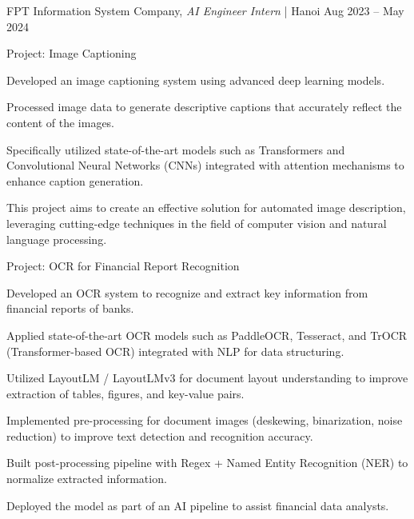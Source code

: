 \vspace{8pt}

\begin{cventries2}

  \cventrynew
  {FPT Information System Company, \textnormal{\textit{AI Engineer Intern} | Hanoi}}
  {Aug 2023 -- May 2024}
  {}

\end{cventries2}

\vspace{-10pt}

\begin{cventries}

  \cventry
    {Project: Image Captioning}
    {}
    {
      \begin{cvitems}
        \item {Developed an image captioning system using advanced deep learning models.}
        \item {Processed image data to generate descriptive captions that accurately reflect the content of the images.}
        \item {Specifically utilized state-of-the-art models such as Transformers and Convolutional Neural Networks (CNNs) integrated with attention mechanisms to enhance caption generation.}
        \item {This project aims to create an effective solution for automated image description, leveraging cutting-edge techniques in the field of computer vision and natural language processing.}
      \end{cvitems}
    }

\vspace{8pt}

  \cventry
    {Project: OCR for Financial Report Recognition}
    {}
    {
      \begin{cvitems}
        \item {Developed an OCR system to recognize and extract key information from financial reports of banks.}
        \item {Applied state-of-the-art OCR models such as PaddleOCR, Tesseract, and TrOCR (Transformer-based OCR) integrated with NLP for data structuring.}
        \item {Utilized LayoutLM / LayoutLMv3 for document layout understanding to improve extraction of tables, figures, and key-value pairs.}
        \item {Implemented pre-processing for document images (deskewing, binarization, noise reduction) to improve text detection and recognition accuracy.}
        \item {Built post-processing pipeline with Regex + Named Entity Recognition (NER) to normalize extracted information.}
        \item {Deployed the model as part of an AI pipeline to assist financial data analysts.}
      \end{cvitems}
    }

\end{cventries}

